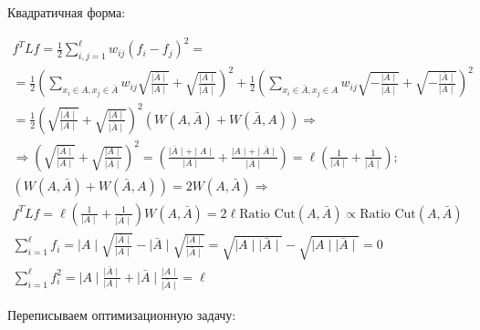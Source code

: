 \documentclass[a4paper, 12pt]{article}
\begin{document}
Квадратичная форма:

\begin{gather*}
    f^TLf = \frac{1}{2}\sum_{i, j = 1}^{\ell} 
    w_{ij}(f_i - f_j)^2 = \\
    = \frac{1}{2}\left(\sum_{x_i \in A, x_j \in \bar{A}} w_{ij}
    \sqrt{\frac{\mid\bar{A}\mid}{\mid A \mid}} +
    \sqrt{\frac{\mid A\mid}{\mid \bar{A} \mid}}\right)^2 +
    \frac{1}{2}\left(\sum_{x_i \in \bar{A}, x_j \in A} w_{ij}
    \sqrt{-\frac{\mid A \mid}{\mid \bar{A} \mid}} + 
    \sqrt{-\frac{\mid \bar{A} \mid}{\mid A \mid}}\right)^2 \\
    = \frac{1}{2}\left(\sqrt{\frac{\mid\bar{A}\mid}{\mid A \mid}} +
    \sqrt{\frac{\mid A\mid}{\mid \bar{A} \mid}}\right)^2
    (W(A, \bar{A}) + W(\bar{A}, A)) \Rightarrow \\
    \Rightarrow \left(\sqrt{\frac{\mid\bar{A}\mid}{\mid A \mid}} +
    \sqrt{\frac{\mid A\mid}{\mid \bar{A} \mid}}\right)^2
    = \left(\frac{\mid \bar{A} \mid + \mid A \mid}{\mid A \mid}
    + \frac{\mid A \mid + \mid \bar{A} \mid}{\mid \bar{A} \mid}\right)
    = \ell (\frac{1}{\mid A \mid} + \frac{1}{\mid \bar{A} \mid}); \\
    (W(A, \bar{A}) + W(\bar{A}, A)) = 2W(A, \bar{A}) \Rightarrow \\
    f^TLf = \ell(\frac{1}{\mid A \mid} + \frac{1}{\mid \bar{A} \mid})
    W(A, \bar{A}) = 2\ell\textrm{Ratio Cut}(A, \bar{A}) 
    \propto \textrm{Ratio Cut}(A, \bar{A}) \\
    \sum_{i = 1}^{\ell}f_i = \mid A \mid 
    \sqrt{\frac{\mid\bar{A}\mid}{\mid A \mid}} - 
    \mid \bar{A} \mid 
    \sqrt{\frac{\mid A \mid}{\mid \bar{A} \mid}}
    = \sqrt{\mid A \mid \mid \bar{A} \mid} - 
    \sqrt{\mid A \mid \mid \bar{A} \mid} = 0 \\
    \sum_{i = 1}^{\ell}f_i^2 = 
    \mid A \mid
    \frac{\mid\bar{A}\mid}{\mid A \mid} +
    \mid \bar{A} \mid 
    \frac{\mid A \mid}{\mid \bar{A} \mid}
    = \ell
\end{gather*}

Переписываем оптимизационную задачу:
\end{document}
